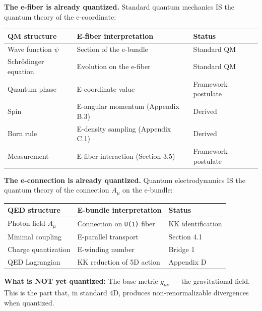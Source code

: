 \documentclass[aps,prd,preprint,superscriptaddress,longbibliography,floatfix]{revtex4-2}
\theoremstyle{remark}
\begin{document}
\textbf{The e-fiber is already quantized.} Standard quantum mechanics IS the quantum theory of the e-coordinate:


\begin{table}[H]
\begin{ruledtabular}
\begin{tabular}{p{5.0cm}p{5.0cm}p{5.0cm}}
QM structure & E-fiber interpretation & Status \\
\hline
Wave function $\psi$ & Section of the e-bundle & Standard QM \\
Schr\"{o}dinger equation & Evolution on the e-fiber & Standard QM \\
Quantum phase & E-coordinate value & Framework postulate \\
Spin & E-angular momentum (Appendix B.3) & Derived \\
Born rule & E-density sampling (Appendix C.1) & Derived \\
Measurement & E-fiber interaction (Section 3.5) & Framework postulate \\
\end{tabular}
\end{ruledtabular}
\end{table}

\textbf{The e-connection is already quantized.} Quantum electrodynamics IS the quantum theory of the connection $A_\mu$ on the e-bundle:


\begin{table}[H]
\begin{ruledtabular}
\begin{tabular}{p{5.0cm}p{5.0cm}p{5.0cm}}
QED structure & E-bundle interpretation & Status \\
\hline
Photon field $A_\mu$ & Connection on \texttt{U(1)} fiber & KK identification \\
Minimal coupling & E-parallel transport & Section 4.1 \\
Charge quantization & E-winding number & Bridge 1 \\
QED Lagrangian & KK reduction of 5D action & Appendix D \\
\end{tabular}
\end{ruledtabular}
\end{table}

\textbf{What is NOT yet quantized:} The base metric $g_{\mu\nu}$ --- the gravitational field. This is the part that, in standard 4D, produces non-renormalizable divergences when quantized.
\end{document}
